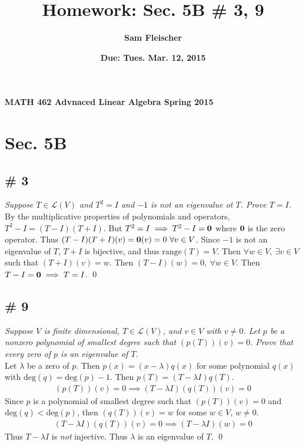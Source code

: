 \documentclass[12pt]{article}
\begin{document}
{\bf MATH 462 \hfill Advnaced Linear Algebra \hfill Spring 2015}

\title{\bf Homework: Sec. 5B \# 3, 9}
\author{\bf Sam Fleischer}
\date{\bf Due: Tues. Mar. 12, 2015}

{\let\newpage\relax\maketitle}
\maketitle

\section*{Sec. 5B}
\subsection*{\# 3}
{\it Suppose $T \in \mathcal{L}(V)$ and $T^2 = I$ and $-1$ is not an eigenvalue ot $T$.  Prove $T = I$.} \\

\noindent By the multiplicative properties of polynomials and operators, $T^2 - I = (T - I)(T + I)$.  But $T^2 = I \implies T^2 - I = {\bf 0}$ where ${\bf 0}$ is the zero operator.  Thus $(T - I)(T + I)(v) = {\bf 0}(v) = 0\ \forall v \in V$.  Since $-1$ is not an eigenvalue of $T$, $T + I$ is bijective, and thus $\text{range}(T) = V$.  Then $\forall w \in V,\ \exists v \in V$ such that $(T + I)(v) = w$.  Then $(T - I)(w) = 0,\ \forall w \in V$.  Then $T - I = {\bf 0} \implies T = I$. \qed

\subsection*{\# 9}
{\it Suppose $V$ is finite dimensional, $T \in \mathcal{L}(V)$, and $v \in V$ with $v \neq 0$.  Let $p$ be a nonzero polynomial of smallest degree such that $(p(T))(v) = 0$.  Prove that every zero of $p$ is an eigenvalue of $T$.} \\

\noindent Let $\lambda$ be a zero of $p$.  Then $p(x) = (x - \lambda)q(x)$ for some polynomial $q(x)$ with $\text{deg}(q) = \text{deg}(p) - 1$.  Then $p(T) = (T - \lambda I)q(T)$.
\begin{align*}
(p(T))(v) = 0 \implies (T - \lambda I)(q(T))(v) = 0
\end{align*}
Since $p$ is a polynomial of smallest degree such that $(p(T))(v) = 0$ and $\text{deg}(q) < \text{deg}(p)$, then $(q(T))(v) = w$ for some $w\in V$, $w \neq 0$.
\begin{align*}
(T - \lambda I)(q(T))(v) = 0 \implies (T - \lambda I)(w) = 0
\end{align*}
Thus $T - \lambda I$ is {\it not} injective.  Thus $\lambda$ is an eigenvalue of $T$. \qed
\end{document}
